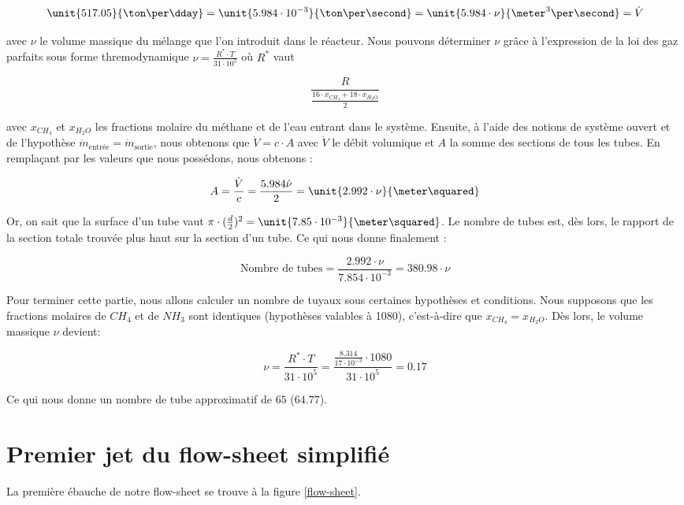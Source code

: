 $$\unit{517.05}{\ton\per\dday} = \unit{5.984\cdot 10^{-3}}{\ton\per\second} = \unit{5.984\cdot \nu}{\meter^{3}\per\second} = \dot{V}$$

avec $\nu$ le volume massique du mélange que l'on introduit dans le réacteur. Nous pouvons déterminer $\nu$ grâce à 
l'expression de la loi des gaz parfaits sous forme thremodynamique $\nu = \frac{R^*\cdot T}{31\cdot 10^{5}}$ où $R^{*}$ vaut 

$$\frac{R}{\frac{16\cdot x_{CH_4}+18\cdot x_{H_2O}}{2}}$$

avec $x_{CH_4}$ et $x_{H_2O}$ les fractions molaire du méthane
et de l'eau entrant dans le système. Ensuite, à l'aide des notions de système ouvert et de l'hypothèse $\dot{m}_{\text{entrée}} = \dot{m}_{\text{sortie}}$,
nous obtenons que $\dot{V} = c \cdot  A$ avec $\dot{V}$ le débit volumique et $A$ la somme des sections de tous les tubes. 
En remplaçant par les valeurs que nous possédons, nous obtenons :

$$A = \frac{\dot{V}}{c} = \frac{5.984\dot \nu}{2} = \unit{2.992\cdot \nu}{\meter\squared}$$

Or, on sait que la surface d'un tube vaut $\pi\cdot (\frac{d}{2})^{2} = \unit{7.85\cdot 10^{-3}}{\meter\squared}$. 
Le nombre de tubes est, dès lors, le rapport de la section totale trouvée plus haut sur la section d'un tube. 
Ce qui nous donne finalement : 

$$\text{Nombre de tubes} = \frac{2.992\cdot \nu}{7.854\cdot 10^{-3}} = 380.98\cdot \nu$$

Pour terminer cette partie, nous allons calculer un nombre de tuyaux sous certaines hypothèses et conditions.
Nous supposons que les fractions molaires de $CH_{4}$ et de $NH_{3}$ sont identiques (hypothèses valables à \unit{1080}{\kelvin}),
c'est-à-dire que $x_{CH_4} = x_{H_2O}$. Dès lors, le volume massique $\nu$ devient:

$$\nu = \frac{R^*\cdot T}{31\cdot 10^5} = \frac{\frac{8.314}{17\cdot 10^{-3}}\cdot 1080}{31\cdot 10^5} = 0.17$$

Ce qui nous donne un nombre de tube approximatif de $65$ ($64.77$).


\newpage
\annexe
\section{Premier jet du flow-sheet simplifié}
La première ébauche de notre flow-sheet se trouve à la figure \ref{flow-sheet}.


